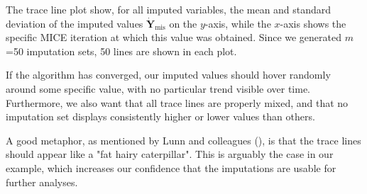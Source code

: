 The trace line plot show, for all imputed variables, the mean and standard deviation of the imputed values $\dot{\mathbf{Y}}_{\text{mis}}$ on the $y$-axis, while the $x$-axis shows the specific \textsf{MICE} iteration at which this value was obtained. Since we generated $m$=50 imputation sets, 50 lines are shown in each plot.

If the algorithm has converged, our imputed values should hover randomly around some specific value, with no particular trend visible over time. Furthermore, we also want that all trace lines are properly mixed, and that no imputation set displays consistently higher or lower values than others. 

A good metaphor, as mentioned by Lunn and colleagues (\citeyear[][chap. 4.4.1]{lunn2013bugs}), is that the trace lines should appear like a "fat hairy caterpillar". This is arguably the case in our example, which increases our confidence that the imputations are usable for further analyses. 



